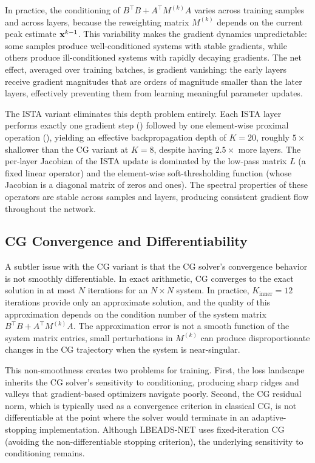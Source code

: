 In practice, the conditioning of $B^\top B + A^\top M^{(k)} A$ varies across training samples and across layers, because the reweighting matrix $M^{(k)}$ depends on the current peak estimate $\mathbf{x}^{k-1}$. This variability makes the gradient dynamics unpredictable: some samples produce well-conditioned systems with stable gradients, while others produce ill-conditioned systems with rapidly decaying gradients. The net effect, averaged over training batches, is gradient vanishing: the early layers receive gradient magnitudes that are orders of magnitude smaller than the later layers, effectively preventing them from learning meaningful parameter updates.

The ISTA variant eliminates this depth problem entirely. Each ISTA layer performs exactly one gradient step () followed by one element-wise proximal operation (), yielding an effective backpropagation depth of $K = 20$, roughly $5\times$ shallower than the CG variant at $K = 8$, despite having $2.5\times$ more layers. The per-layer Jacobian of the ISTA update is dominated by the low-pass matrix $L$ (a fixed linear operator) and the element-wise soft-thresholding function (whose Jacobian is a diagonal matrix of zeros and ones). The spectral properties of these operators are stable across samples and layers, producing consistent gradient flow throughout the network.


\subsection{CG Convergence and Differentiability}
\label{sec:disc_cg_convergence}

A subtler issue with the CG variant is that the CG solver's convergence behavior is not smoothly differentiable. In exact arithmetic, CG converges to the exact solution in at most $N$ iterations for an $N \times N$ system. In practice, $K_{\text{inner}} = 12$ iterations provide only an approximate solution, and the quality of this approximation depends on the condition number of the system matrix $B^\top B + A^\top M^{(k)} A$. The approximation error is not a smooth function of the system matrix entries, small perturbations in $M^{(k)}$ can produce disproportionate changes in the CG trajectory when the system is near-singular.

This non-smoothness creates two problems for training. First, the loss landscape inherits the CG solver's sensitivity to conditioning, producing sharp ridges and valleys that gradient-based optimizers navigate poorly. Second, the CG residual norm, which is typically used as a convergence criterion in classical CG, is not differentiable at the point where the solver would terminate in an adaptive-stopping implementation. Although LBEADS-NET uses fixed-iteration CG (avoiding the non-differentiable stopping criterion), the underlying sensitivity to conditioning remains.


